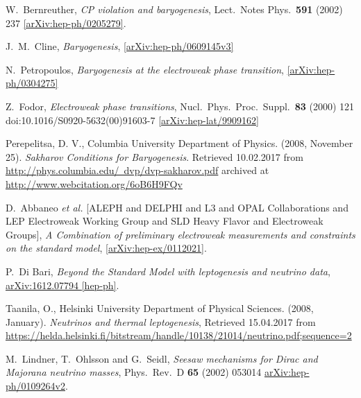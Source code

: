 \begin{thebibliography}{56}
W.~Bernreuther,
\textit{CP violation and baryogenesis},
Lect.\ Notes Phys.\  {\textbf{591}} (2002) 237
\href{https://arxiv.org/abs/hep-ph/0205279}{[arXiv:hep-ph/0205279]}.

J.~M.~Cline,
\textit{Baryogenesis}, 
\href{https://arxiv.org/abs/hep-ph/0609145v3}{[arXiv:hep-ph/0609145v3]}

N.~Petropoulos,
\textit{Baryogenesis at the electroweak phase transition},
\href{https://arxiv.org/abs/hep-ph/0304275}{[arXiv:hep-ph/0304275]}

Z.~Fodor,
\textit{Electroweak phase transitions},
Nucl.\ Phys.\ Proc.\ Suppl.\  {\textbf{83}} (2000) 121\newline
doi:10.1016/S0920-5632(00)91603-7
\href{https://arxiv.org/abs/hep-lat/9909162v1}{[arXiv:hep-lat/9909162]}

Perepelitsa, D. V., Columbia University Department of Physics.
(2008, November 25). \textit{Sakharov Conditions for Baryogenesis}.  Retrieved
10.02.2017 from \href{http://phys.columbia.edu/~dvp/dvp-sakharov.pdf}{http://phys.columbia.edu/~dvp/dvp-sakharov.pdf} archived at
 \href{http://www.webcitation.org/6oB6H9FQv}{http://www.webcitation.org/6oB6H9FQv}

D.~Abbaneo {\textit{et al.}} [ALEPH and DELPHI and L3 and OPAL Collaborations and LEP Electroweak Working Group and SLD Heavy Flavor and Electroweak Groups],
\textit{A Combination of preliminary electroweak measurements and constraints on the standard model},
\href{https://arxiv.org/abs/hep-ex/0112021}{[arXiv:hep-ex/0112021]}.

P.~Di Bari,
\textit{Beyond the Standard Model with leptogenesis and neutrino data},
\href{https://arxiv.org/abs/1612.07794}{arXiv:1612.07794 [hep-ph]}.

Taanila, O., Helsinki University Department of Physical Sciences. (2008, January). \textit{Neutrinos and thermal leptogenesis}, Retrieved 15.04.2017 from \href{https://helda.helsinki.fi/bitstream/handle/10138/21014/neutrino.pdf;sequence=2}{https://helda.helsinki.fi/bitstream/handle/10138/21014/neutrino.pdf;sequence=2}

M.~Lindner, T.~Ohlsson and G.~Seidl,
\textit{Seesaw mechanisms for Dirac and Majorana neutrino masses},
Phys.\ Rev.\ D {\textbf{ 65}} (2002) 053014
\href{https://arxiv.org/abs/hep-ph/0109264v2}{arXiv:hep-ph/0109264v2}.


\end{thebibliography}

